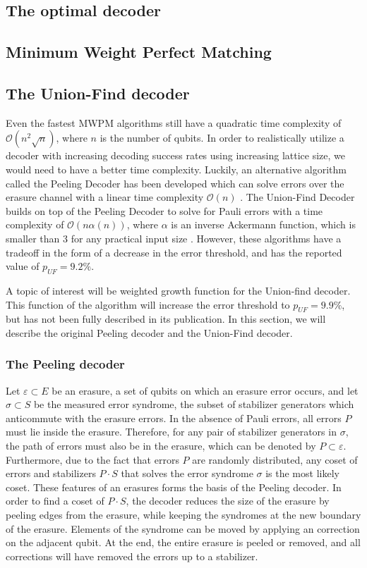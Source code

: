\subsection{The optimal decoder}
\subsection{Minimum Weight Perfect Matching}
\subsection{The Union-Find decoder}

Even the fastest MWPM algorithms still have a quadratic time complexity of $\mathcal{O}(n^2\sqrt{n})$, where $n$ is the number of qubits. In order to realistically utilize a decoder with increasing decoding success rates using increasing lattice size, we would need to have a better time complexity. Luckily, an alternative algorithm called the Peeling Decoder has been developed which can solve errors over the erasure channel with a linear time complexity $\mathcal{O}(n)$ \cite{delfosse2017}. The Union-Find Decoder builds on top of the Peeling Decoder to solve for Pauli errors with a time complexity of $\mathcal{O}(n\alpha(n))$, where $\alpha$ is an inverse Ackermann function, which is smaller than 3 for any practical input size \cite{nickerson2017}. However, these algorithms have a tradeoff in the form of a decrease in the error threshold, and has the reported value of $p_{UF} = 9.2\%$.

A topic of interest will be weighted growth function for the Union-find decoder. This function of the algorithm will increase the error threshold to $p_{UF} = 9.9\%$, but has not been fully described in its publication.  In this section, we will describe the original Peeling decoder and the Union-Find decoder.   \\

\subsubsection{The Peeling decoder}
Let $\varepsilon \subset E$ be an erasure, a set of qubits on which an erasure error occurs, and let $\sigma \subset S$ be the measured error syndrome, the subset of stabilizer generators which anticommute with the erasure errors. In the absence of Pauli errors, all errors $P$ must lie inside the erasure. Therefore, for any pair of stabilizer generators in $\sigma$, the path of errors must also be in the erasure, which can be denoted by $P\subset \varepsilon$. Furthermore, due to the fact that errors $P$ are randomly distributed, any coset of errors and stabilizers $P\cdot S$ that solves the error syndrome $\sigma$ is the most likely coset. These features of an erasures forms the basis of the Peeling decoder. In order to find a coset of $P \cdot S$, the decoder reduces the size of the erasure by peeling edges from the erasure, while keeping the syndromes at the new boundary of the erasure. Elements of the syndrome can be moved by applying an correction on the adjacent qubit. At the end, the entire erasure is peeled or removed, and all corrections will have removed the errors up to a stabilizer.

